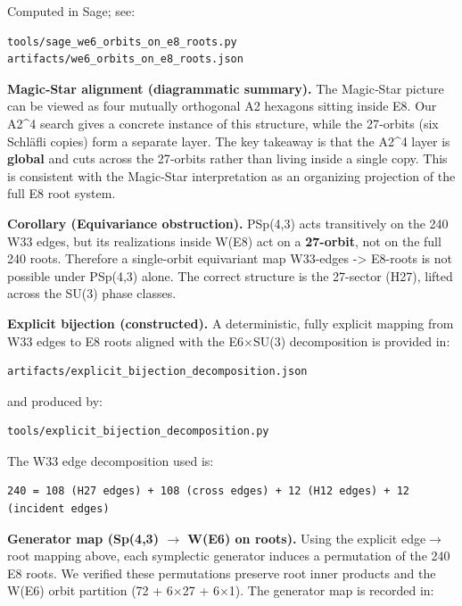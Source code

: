 \documentclass[11pt]{article}
\begin{document}


Computed in Sage; see:

\begin{verbatim}
tools/sage_we6_orbits_on_e8_roots.py
artifacts/we6_orbits_on_e8_roots.json
\end{verbatim}

\textbf{Magic‑Star alignment (diagrammatic summary).} The Magic‑Star
picture can be viewed as four mutually orthogonal A2 hexagons sitting
inside E8. Our A2\^{}4 search gives a concrete instance of this
structure, while the 27‑orbits (six Schläfli copies) form a separate
layer. The key takeaway is that the A2\^{}4 layer is \textbf{global} and
cuts across the 27‑orbits rather than living inside a single copy. This
is consistent with the Magic‑Star interpretation as an organizing
projection of the full E8 root system.

\textbf{Corollary (Equivariance obstruction).} PSp(4,3) acts
transitively on the 240 W33 edges, but its realizations inside W(E8) act
on a \textbf{27-orbit}, not on the full 240 roots. Therefore a
single-orbit equivariant map W33-edges -\textgreater{} E8-roots is not
possible under PSp(4,3) alone. The correct structure is the 27-sector
(H27), lifted across the SU(3) phase classes.

\textbf{Explicit bijection (constructed).} A deterministic, fully
explicit mapping from W33 edges to E8 roots aligned with the
E6\ensuremath{\times}SU(3) decomposition is provided in:

\begin{verbatim}
artifacts/explicit_bijection_decomposition.json
\end{verbatim}

and produced by:

\begin{verbatim}
tools/explicit_bijection_decomposition.py
\end{verbatim}

The W33 edge decomposition used is:

\begin{verbatim}
240 = 108 (H27 edges) + 108 (cross edges) + 12 (H12 edges) + 12 (incident edges)
\end{verbatim}

\textbf{Generator map (Sp(4,3) \ensuremath{\rightarrow} W(E6) on
roots).} Using the explicit edge\ensuremath{\rightarrow}root mapping
above, each symplectic generator induces a permutation of the 240 E8
roots. We verified these permutations preserve root inner products and
the W(E6) orbit partition (72 + 6\ensuremath{\times}27 +
6\ensuremath{\times}1). The generator map is recorded in:
\end{document}
